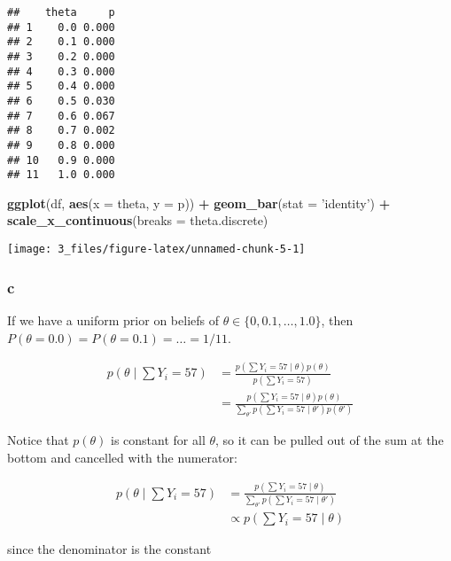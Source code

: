 \documentclass[]{article}
\newenvironment{Shaded}{\begin{snugshade}}{\end{snugshade}}
\newcommand{\DataTypeTok}[1]{\textcolor[rgb]{0.13,0.29,0.53}{#1}}
\newcommand{\KeywordTok}[1]{\textcolor[rgb]{0.13,0.29,0.53}{\textbf{#1}}}
\newcommand{\NormalTok}[1]{#1}
\newcommand{\OperatorTok}[1]{\textcolor[rgb]{0.81,0.36,0.00}{\textbf{#1}}}
\newcommand{\StringTok}[1]{\textcolor[rgb]{0.31,0.60,0.02}{#1}}
\begin{document}
\begin{verbatim}
##    theta     p
## 1    0.0 0.000
## 2    0.1 0.000
## 3    0.2 0.000
## 4    0.3 0.000
## 5    0.4 0.000
## 6    0.5 0.030
## 7    0.6 0.067
## 8    0.7 0.002
## 9    0.8 0.000
## 10   0.9 0.000
## 11   1.0 0.000
\end{verbatim}

\begin{Shaded}
\begin{Highlighting}[]
\KeywordTok{ggplot}\NormalTok{(df, }\KeywordTok{aes}\NormalTok{(}\DataTypeTok{x =}\NormalTok{ theta, }\DataTypeTok{y =}\NormalTok{ p)) }\OperatorTok{+}
\StringTok{  }\KeywordTok{geom_bar}\NormalTok{(}\DataTypeTok{stat =} \StringTok{'identity'}\NormalTok{) }\OperatorTok{+}
\StringTok{  }\KeywordTok{scale_x_continuous}\NormalTok{(}\DataTypeTok{breaks =}\NormalTok{ theta.discrete)}
\end{Highlighting}
\end{Shaded}

\begin{center}\texttt{[image: 3\_files/figure-latex/unnamed-chunk-5-1]} \end{center}

\hypertarget{c}{%
\subsubsection{c}\label{c}}

If we have a uniform prior on beliefs of
\(\theta \in \{0, 0.1, \dots, 1.0\}\), then
\(P(\theta = 0.0) = P(\theta = 0.1) = \dots = 1/11\).

\begin{align}
p(\theta \mid \sum Y_i = 57) &= \frac{p(\sum Y_i = 57 \mid \theta)p(\theta)}{p(\sum Y_i = 57)} \\
&= \frac{p(\sum Y_i = 57 \mid \theta)p(\theta)}{\sum_{\theta'} p(\sum Y_i = 57 \mid \theta') p(\theta')} 
\end{align}

Notice that \(p(\theta)\) is constant for all \(\theta\), so it can be
pulled out of the sum at the bottom and cancelled with the numerator:

\begin{align}
p(\theta \mid \sum Y_i = 57)
&= \frac{p(\sum Y_i = 57 \mid \theta)}{\sum_{\theta'} p(\sum Y_i = 57 \mid \theta')} \\
&\propto p(\sum Y_i = 57 \mid \theta)
\end{align}

since the denominator is the constant
\end{document}
